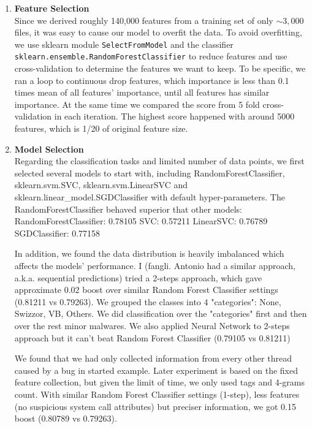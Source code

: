 \documentclass[11pt]{article}
\begin{document}
\begin{enumerate}
\item \textbf{Feature Selection}\\
Since we derived roughly 140,000 features from a training set of only $\sim 3,000$ files, it was easy to cause our model to overfit the data. To avoid overfitting, we use sklearn module \verb|SelectFromModel| and the classifier \verb|sklearn.ensemble.RandomForestClassifier| to reduce features and use cross-validation to determine the features we want to keep. To be specific, we ran a loop to continuous drop features, which importance is less than 0.1 times mean of all features' importance, until all features has similar importance. At the same time we compared the score from 5 fold cross-validation in each iteration. The highest score happened with around 5000 features, which is 1/20 of original feature size. 
\item\textbf{Model Selection}\\
Regarding the classification tasks and limited number of data points, we first selected several models to start with, including RandomForestClassifier, sklearn.svm.SVC, sklearn.svm.LinearSVC and sklearn.linear\_model.SGDClassifier with default hyper-parameters. The RandomForestClassifier behaved superior that other models:
RandomForestClassifier: 0.78105
SVC: 0.57211
LinearSVC: 0.76789
SGDClassifier: 0.77158

In addition, we found the data distribution is heavily imbalanced which affects the models' performance. I (fangli. Antonio had a similar approach, a.k.a. sequential predictions) tried a 2-steps approach, which gave approximate 0.02 boost over similar Random Forest Classifier settings (0.81211 vs 0.79263). We grouped the classes into 4 "categories": None, Swizzor, VB, Others. We did classification over the "categories" first and then over the rest minor malwares. We also applied Neural Network to 2-steps approach but it can't beat Random Forest Classifier (0.79105 vs 0.81211)

We found that we had only collected information from every other thread caused by a bug in started example. Later experiment is based on the fixed feature collection, but given the limit of time, we only used tags and 4-grams count. With similar Random Forest Classifier settings (1-step), less features (no suspicious system call attributes) but preciser information, we got 0.15 boost (0.80789 vs 0.79263).


\end{enumerate}
\end{document}
